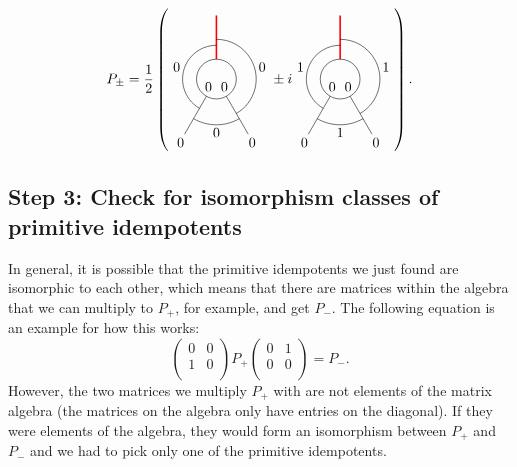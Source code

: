 	\begin{equation}
		P_\pm=\frac{1}{2}\left(
			\begin{tikzpicture}[scale=1,baseline=(current bounding box.center)]
			\draw (0,0) circle (0.5cm);
			\draw
			\foreach \a in {-60, -120} {
				(\a:0.5) -- (\a:1.6)
			};
			\draw[red,line width=0.4mm] (90:0.5) -- (90:1.6);
			\draw ([shift=(-60:1cm)]0,0) arc (-60:90:1cm);
			\draw ([shift=(-120:1.15cm)]0,0) arc (-120:-60:1.15cm);
			\draw ([shift=(240:0.85cm)]0,0) arc (240:90:0.85cm);
			\node at (0.2,-0.2) {$0$};
			\node at (-0.2,-0.2) {$0$};
			\node at (-0.9,-1.6) {$0$};
			\node at (0.9,-1.6) {$0$};
			\node at (-1,0.3) {$0$};
			\node at (1.15,0.3) {$0$};
			\node at (0,-1.35) {$0$};
			\end{tikzpicture}
		\pm i \begin{tikzpicture}[scale=1,baseline=(current bounding box.center)]
			\draw (0,0) circle (0.5cm);
			\draw
			\foreach \a in {-60, -120} {
				(\a:0.5) -- (\a:1.6)
			};
			\draw[red,line width=0.4mm] (90:0.5) -- (90:1.6);
			\draw ([shift=(-60:1cm)]0,0) arc (-60:90:1cm);
			\draw ([shift=(-120:1.15cm)]0,0) arc (-120:-60:1.15cm);
			\draw ([shift=(240:0.85cm)]0,0) arc (240:90:0.85cm);
			\node at (0.2,-0.2) {$0$};
			\node at (-0.2,-0.2) {$0$};
			\node at (-0.9,-1.6) {$0$};
			\node at (0.9,-1.6) {$0$};
			\node at (-1,0.3) {$1$};
			\node at (1.15,0.3) {$1$};
			\node at (0,-1.35) {$1$};
			\end{tikzpicture}\right).
	\end{equation}
	
\subsection*{Step 3: Check for isomorphism classes of primitive idempotents} In general, it is possible that the primitive idempotents we just found are isomorphic to each other, which means that there are matrices within the algebra that we can multiply to $P_+$, for example, and get $P_-$. The following equation is an example for how this works:
	\begin{equation}
		\begin{pmatrix} 0 & 0\\ 1 & 0\\ \end{pmatrix}P_+ \begin{pmatrix} 0 & 1\\ 0 & 0\\ \end{pmatrix}=P_-.
	\end{equation}
However, the two matrices we multiply $P_+$ with are not elements of the matrix algebra (the matrices on the algebra only have entries on the diagonal). If they were elements of the algebra, they would form an isomorphism between $P_+$ and $P_-$ and we had to pick only one of the primitive idempotents.

